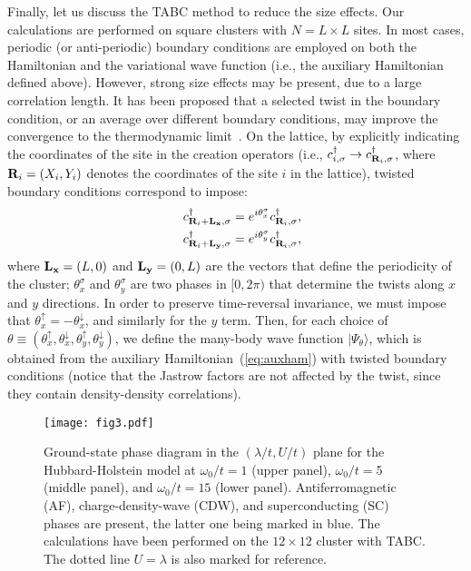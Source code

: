 \documentclass[aps,superscriptaddress,amsmath,amssymb,twocolumn,showpacs,floatfix,english]{revtex4}
\begin{document}
Finally, let us discuss the TABC method to reduce the size effects. Our calculations are performed on square clusters with $N=L \times L$
sites. In most cases, periodic (or anti-periodic) boundary conditions are employed on both the Hamiltonian and the variational wave 
function (i.e., the auxiliary Hamiltonian defined above). However, strong size effects may be present, due to a large correlation length.
It has been proposed that a selected twist in the boundary condition, or an average over different boundary conditions, may improve the 
convergence to the thermodynamic limit~\cite{Lin2001,Dagrada2016}. On the lattice, by explicitly indicating the coordinates of the site 
in the creation operators (i.e., $c^\dag_{i,\sigma} \to c^\dag_{{\bf R}_i,\sigma}$, where ${\bf R}_i=(X_i,Y_i)$ denotes the coordinates 
of the site $i$ in the lattice), twisted boundary conditions correspond to impose:
\begin{eqnarray}
&& c^\dag_{{\bf R}_i+{\bf L_x},\sigma} = e^{i\theta^{\sigma}_{x}} c^\dag_{{\bf R}_i,\sigma}, \label{eq:twistx} \\
&& c^\dag_{{\bf R}_i+{\bf L_y},\sigma} = e^{i\theta^{\sigma}_{y}} c^\dag_{{\bf R}_i,\sigma}, \label{eq:twisty}
\end{eqnarray}
where ${\bf L_x}=(L,0)$ and ${\bf L_y}=(0,L)$ are the vectors that define the periodicity of the cluster; $\theta^{\sigma}_{x}$ and 
$\theta^{\sigma}_{y}$ are two phases in $[0,2\pi)$ that determine the twists along $x$ and $y$ directions. In order to preserve 
time-reversal invariance, we must impose that $\theta^{\uparrow}_{x}=-\theta^{\downarrow}_{x}$, and similarly for the $y$ term. Then,
for each choice of $\theta \equiv (\theta^{\uparrow}_{x},\theta^{\downarrow}_{x},\theta^{\uparrow}_{y},\theta^{\downarrow}_{y})$, we 
define the many-body wave function $|\Psi_{\theta}\rangle$, which is obtained from the auxiliary Hamiltonian~(\ref{eq:auxham}) with
twisted boundary conditions (notice that the Jastrow factors are not affected by the twist, since they contain density-density 
correlations).

\begin{figure}
\texttt{[image: fig3.pdf]}
\caption{\label{fig:phased}
Ground-state phase diagram in the $(\lambda/t,U/t)$ plane for the Hubbard-Holstein model at $\omega_0/t=1$ (upper panel), $\omega_0/t=5$ 
(middle panel), and $\omega_0/t=15$ (lower panel). Antiferromagnetic (AF), charge-density-wave (CDW), and superconducting (SC) phases 
are present, the latter one being marked in blue. The calculations have been performed on the $12 \times 12$ cluster with TABC. 
The dotted line $U=\lambda$ is also marked for reference.}
\end{figure}
\end{document}
